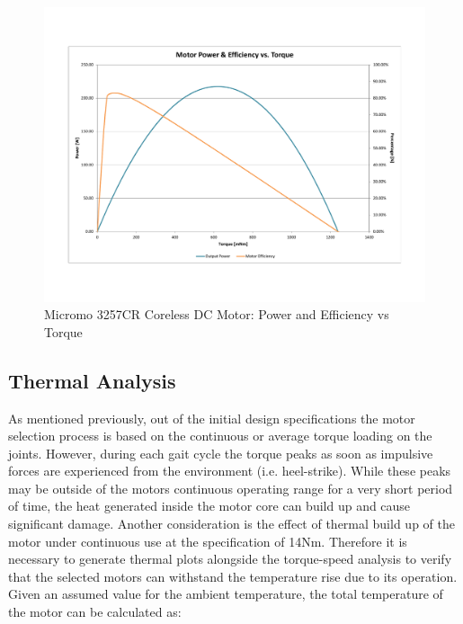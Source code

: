 \begin{figure}[!ht]
	\begin{center}
    \includegraphics[scale=0.6]{fig/design/motor2.pdf}
	\end{center}
  \caption{Micromo 3257CR Coreless DC Motor: Power and Efficiency vs Torque}
\end{figure}


\subsection{Thermal Analysis} %
\label{sub:thermal_analysis}
As mentioned previously, out of the initial design specifications the motor selection process is based on the continuous or average torque loading on the joints. However, during each gait cycle the torque peaks as soon as impulsive forces are experienced from the environment (i.e. heel-strike). While these peaks may be outside of the motors continuous operating range for a very short period of time, the heat generated inside the motor core can build up and cause significant damage. Another consideration is the effect of thermal build up of the motor under continuous use at the specification of 14Nm. Therefore it is necessary to generate thermal plots alongside the torque-speed analysis to verify that the selected motors can withstand the temperature rise due to its operation. Given an assumed value for the ambient temperature, the total temperature of the motor can be calculated as: 


